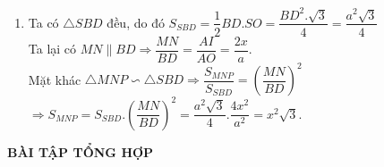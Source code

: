 \begin{bt}
{\begin{enumerate}
{}
	\item Ta có $ \triangle SBD $ đều, do đó $ S_{SBD}=\dfrac{1}{2}BD.SO=\dfrac{BD^2.\sqrt{3}}{4} =\dfrac{a^2\sqrt{3}}{4}$\\
Ta lại có $ MN \parallel BD \Rightarrow \dfrac{MN}{BD} =\dfrac{AI}{AO}=\dfrac{2x}{a}.$\\
Mặt khác $ \triangle MNP \backsim \triangle SBD \Rightarrow \dfrac{S_{MNP}}{S_{SBD}}= \left( \dfrac{MN}{BD}\right)^2 $\\
$\Rightarrow S_{MNP} =S_{SBD}.\left(\dfrac{MN}{BD}\right)^2=\dfrac{a^2\sqrt{3}}{4}.\dfrac{4x^2}{a^2}=x^2\sqrt{3}.$
\end{enumerate}		
}
\end{bt}
\begin{center}
\textbf{BÀI TẬP TỔNG HỢP}
\end{center}
